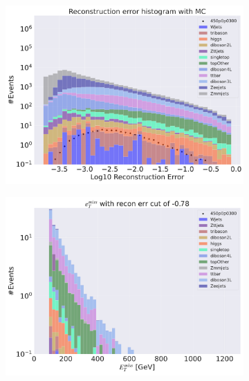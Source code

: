 \begin{figure}[H]
    \centering
    \begin{subfigure}{.49\textwidth}
        \includegraphics[width=\textwidth]{Figures/AE_testing/big/3lep/b_data_recon_big_rm3_feats_sig_450p0p0300.pdf}
        \caption{ }
        \label{fig:AE_3lep_big_450_3}
    \end{subfigure}
    \hfill
    \begin{subfigure}{.49\textwidth}
        \includegraphics[width=\textwidth]{Figures/AE_testing/big/3lep/b_data_recon_big_rm3_feats_sig_450p0p0300_etmiss_recon_errcut_-0.78.pdf}
        \caption{}
        \label{fig:AE_3lep_big_etmiss_450_3}
    \end{subfigure}

\end{figure}
